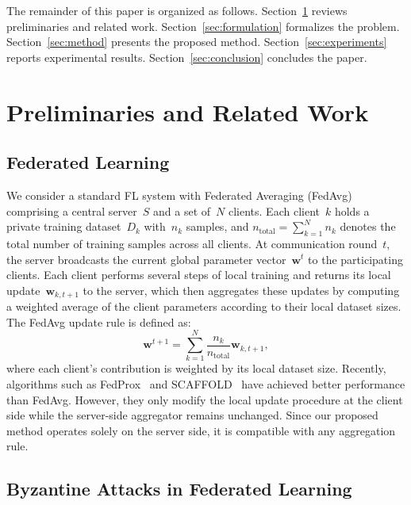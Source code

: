 \documentclass[journal]{IEEEtran}
\begin{document}
The remainder of this paper is organized as follows. Section~\ref{sec:preliminaries} reviews preliminaries and related work. Section~\ref{sec:formulation} formalizes the problem. Section~\ref{sec:method} presents the proposed method. Section~\ref{sec:experiments} reports experimental results. Section~\ref{sec:conclusion} concludes the paper.

\section{Preliminaries and Related Work}
\label{sec:preliminaries}

\subsection{Federated Learning}

We consider a standard FL system with Federated Averaging (FedAvg)~\cite{mcmahan2017communication} comprising a central server~$S$ and a set of~$N$ clients. Each client~$k$ holds a private training dataset~$D_k$ with~$n_k$ samples, and $n_{\text{total}} = \sum_{k=1}^{N} n_k$ denotes the total number of training samples across all clients. At communication round~$t$, the server broadcasts the current global parameter vector~$\mathbf{w}^t$ to the participating clients. Each client performs several steps of local training and returns its local update~$\mathbf{w}_{k,t+1}$ to the server, which then aggregates these updates by computing a weighted average of the client parameters according to their local dataset sizes. The FedAvg update rule is defined as:
\begin{equation}
\mathbf{w}^{t+1} = \sum_{k=1}^{N} \frac{n_k}{n_{\text{total}}} \mathbf{w}_{k,t+1},
\label{eq:fedavg}
\end{equation}
where each client's contribution is weighted by its local dataset size. Recently, algorithms such as FedProx~\cite{li2020federated} and SCAFFOLD~\cite{karimireddy2021scaffold} have achieved better performance than FedAvg. However, they only modify the local update procedure at the client side while the server-side aggregator remains unchanged. Since our proposed method operates solely on the server side, it is compatible with any aggregation rule.

\subsection{Byzantine Attacks in Federated Learning}
\end{document}
